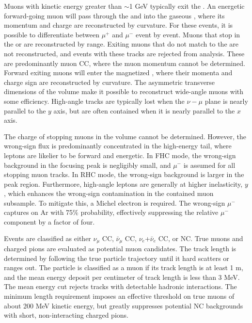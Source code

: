 Muons with kinetic energy greater than $\sim$1 GeV typically exit the . An energetic forward-going muon will pass through the  and into the gaseous , where its momentum and charge are reconstructed by curvature. For these events, it is possible to differentiate between $\mu^{+}$ and $\mu^{-}$ event by event. Muons that stop in the  or  are reconstructed by range. Exiting muons that do not match to the   are not reconstructed, and events with these tracks are rejected from analysis.
These are predominantly muon CC, where the muon momentum cannot be determined. Forward exiting muons will enter the magnetized , where their momenta and charge sign are reconstructed by curvature. The asymmetric transverse dimensions of the  volume make it possible to reconstruct wide-angle muons with some efficiency. High-angle tracks are typically lost when the $\nu-\mu$ plane is nearly parallel to the $y$ axis, but are often contained when it is nearly parallel to the $x$ axis. 

The charge of stopping muons in the  volume cannot be determined. However, the wrong-sign flux is predominantly concentrated in the high-energy tail, where leptons are likelier to be forward and energetic. In FHC mode, the wrong-sign background in the focusing peak is negligibly small, and $\mu^{-}$ is assumed for all stopping muon tracks. In RHC mode, the wrong-sign background is larger in the peak region. Furthermore, high-angle leptons are generally at higher inelasticity, $y$, which enhances the wrong-sign contamination in the contained muon subsample. To mitigate this, a Michel electron is required. The wrong-sign $\mu^{-}$ captures on Ar with 75\% probability, effectively suppressing the relative $\mu^{-}$ component by a factor of four.

Events are classified as either $\nu_{\mu}$ CC, $\bar{\nu}_{\mu}$ CC, $\nu_{e}$+$\bar{\nu}_{e}$ CC, or NC. True muons and charged pions are evaluated as potential muon candidates. The track length is determined by following the true particle trajectory until it hard scatters or ranges out. The particle is classified as a muon if its track length is at least 1 m, and the mean energy deposit per centimeter of track length is less than 3 MeV. The mean energy cut rejects tracks with detectable hadronic interactions. The minimum length requirement imposes an effective threshold on true muons of about 200 MeV kinetic energy, but greatly suppresses potential NC backgrounds with short, non-interacting charged pions.

